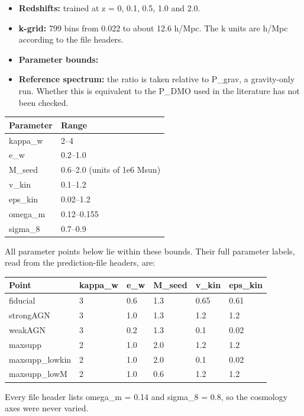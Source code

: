 \documentclass[11pt,a4paper]{article}
\begin{document}
\begin{itemize}
  \item \textbf{Redshifts:} trained at z = 0, 0.1, 0.5, 1.0 and 2.0.
  \item \textbf{k-grid:} 799 bins from 0.022 to about 12.6 h/Mpc. The k units are h/Mpc according to the file headers.
  \item \textbf{Parameter bounds:}
\end{itemize}
\begin{itemize}
  \item \textbf{Reference spectrum:} the ratio is taken relative to P\_grav, a gravity-only run. Whether this is equivalent to the P\_DMO used in the literature has not been checked.
\end{itemize}
\begin{longtable}{@{}p{}p{}@{}}
\toprule
\textbf{Parameter} & \textbf{Range} \\ \midrule \endhead
kappa\_w & 2--4 \\
e\_w & 0.2--1.0 \\
M\_seed & 0.6--2.0 (units of 1e6 Msun) \\
v\_kin & 0.1--1.2 \\
eps\_kin & 0.02--1.2 \\
omega\_m & 0.12--0.155 \\
sigma\_8 & 0.7--0.9 \\
\bottomrule\end{longtable}
All parameter points below lie within these bounds. Their full parameter labels, read from the prediction-file headers, are:

\begin{longtable}{@{}p{}p{}p{}p{}p{}p{}@{}}
\toprule
\textbf{Point} & \textbf{kappa\_w} & \textbf{e\_w} & \textbf{M\_seed} & \textbf{v\_kin} & \textbf{eps\_kin} \\ \midrule \endhead
fiducial & 3 & 0.6 & 1.3 & 0.65 & 0.61 \\
strongAGN & 3 & 1.0 & 1.3 & 1.2 & 1.2 \\
weakAGN & 3 & 0.2 & 1.3 & 0.1 & 0.02 \\
maxsupp & 2 & 1.0 & 2.0 & 1.2 & 1.2 \\
maxsupp\_lowkin & 2 & 1.0 & 2.0 & 0.1 & 0.02 \\
maxsupp\_lowM & 2 & 1.0 & 0.6 & 1.2 & 1.2 \\
\bottomrule\end{longtable}
Every file header lists omega\_m = 0.14 and sigma\_8 = 0.8, so the cosmology axes were never varied.
\end{document}

